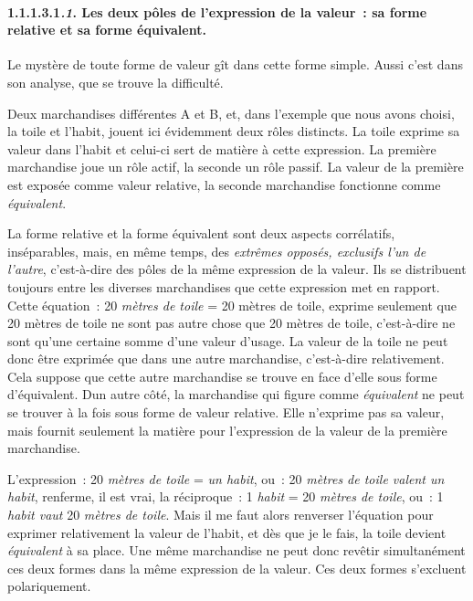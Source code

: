 \documentclass[french,twoside]{book} %
\begin{document}
\paragraph[{1.1.1.3.1.1. Les deux pôles de l’expression de la valeur : sa forme relative et sa forme équivalent.}]{1.1.1.3.1\emph{.1}. Les deux pôles de l’expression de la valeur : sa forme relative et sa forme équivalent.}
\noindent Le mystère de toute forme de valeur gît dans cette forme simple. Aussi c’est dans son analyse, que se trouve la difficulté.\par
Deux marchandises différentes A et B, et, dans l’exemple que nous avons choisi, la toile et l’habit, jouent ici évidemment deux rôles distincts. La toile exprime sa valeur dans l’habit et celui-ci sert de matière à cette expression. La première marchandise joue un rôle actif, la seconde un rôle passif. La valeur de la première est exposée comme valeur relative, la seconde marchandise fonctionne comme \emph{équivalent}.\par
La forme relative et la forme équivalent sont deux aspects corrélatifs, inséparables, mais, en même temps, des \emph{extrêmes opposés, exclusifs l’un de l’autre}, c’est-à-dire des pôles de la même expression de la valeur. Ils se distribuent toujours entre les diverses marchandises que cette expression met en rapport. Cette équation : 20 \emph{mètres de toile} = 20 mètres de toile, exprime seulement que 20 mètres de toile ne sont pas autre chose que 20 mètres de toile, c’est-à-dire ne sont qu’une certaine somme d’une valeur d’usage. La valeur de la toile ne peut donc être exprimée que dans une autre marchandise, c’est-à-dire relativement. Cela suppose que cette autre marchandise se trouve en face d’elle sous forme d’équivalent. Dun autre côté, la marchandise qui figure comme \emph{équivalent} ne peut se trouver à la fois sous forme de valeur relative. Elle n’exprime pas sa valeur, mais fournit seulement la matière pour l’expression de la valeur de la première marchandise.\par
L’expression : 20 \emph{mètres de toile} = \emph{un habit}, ou : 20 \emph{mètres de toile valent un habit}, renferme, il est vrai, la réciproque : 1 \emph{habit} = 20 \emph{mètres de toile}, ou : 1 \emph{habit vaut} 20 \emph{mètres de toile}. Mais il me faut alors renverser l’équation pour exprimer relativement la valeur de l’habit, et dès que je le fais, la toile devient \emph{équivalent} à sa place. Une même marchandise ne peut donc revêtir simultanément ces deux formes dans la même expression de la valeur. Ces deux formes s’excluent polariquement.
\end{document}
